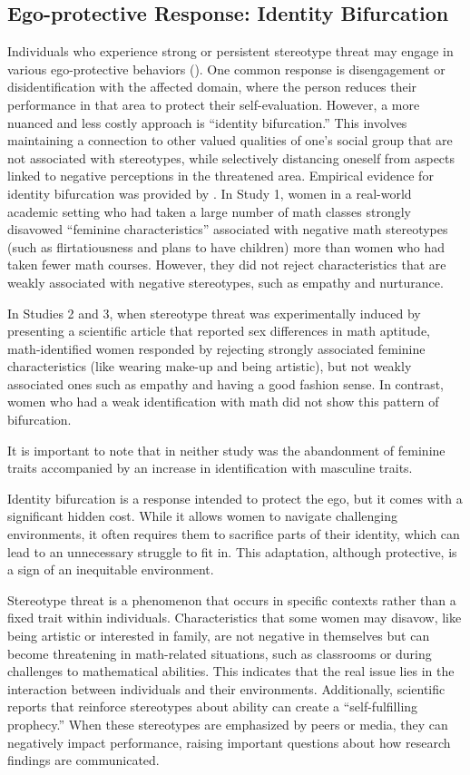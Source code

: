 \subsection{Ego-protective Response: Identity Bifurcation}
Individuals who experience strong or persistent stereotype threat may engage in various ego-protective behaviors (\cite{SnyderMiene1994}). One common response is disengagement or disidentification with the affected domain, where the person reduces their performance in that area to protect their self-evaluation. However, a more nuanced and less costly approach is ``identity bifurcation.'' This involves maintaining a connection to other valued qualities of one's social group that are not associated with stereotypes, while selectively distancing oneself from aspects linked to negative perceptions in the threatened area.
Empirical evidence for identity bifurcation was provided by \textcite{pro}. In Study 1, women in a real-world academic setting who had taken a large number of math classes strongly disavowed ``feminine characteristics'' associated with negative math stereotypes (such as flirtatiousness and plans to have children) more than women who had taken fewer math courses. However, they did not reject characteristics that are weakly associated with negative stereotypes, such as empathy and nurturance. 

In Studies 2 and 3, when stereotype threat was experimentally induced by presenting a scientific article that reported sex differences in math aptitude, math-identified women responded by rejecting strongly associated feminine characteristics (like wearing make-up and being artistic), but not weakly associated ones such as empathy and having a good fashion sense. In contrast, women who had a weak identification with math did not show this pattern of bifurcation. 

It is important to note that in neither study was the abandonment of feminine traits accompanied by an increase in identification with masculine traits.

Identity bifurcation is a response intended to protect the ego, but it comes with a significant hidden cost. While it allows women to navigate challenging environments, it often requires them to sacrifice parts of their identity, which can lead to an unnecessary struggle to fit in. This adaptation, although protective, is a sign of an inequitable environment.

Stereotype threat is a phenomenon that occurs in specific contexts rather than a fixed trait within individuals. Characteristics that some women may disavow, like being artistic or interested in family, are not negative in themselves but can become threatening in math-related situations, such as classrooms or during challenges to mathematical abilities. This indicates that the real issue lies in the interaction between individuals and their environments.
Additionally, scientific reports that reinforce stereotypes about ability can create a ``self-fulfilling prophecy.'' When these stereotypes are emphasized by peers or media, they can negatively impact performance, raising important questions about how research findings are communicated.

